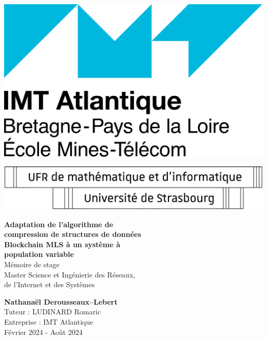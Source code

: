 \begin{titlepage}


    \begin{minipage}{\linewidth}
        \begin{minipage}{0.25\linewidth}
            \centering
            \includegraphics[width=\linewidth]{figs/logo-imt.png}
        \end{minipage}
        \hfill
        \begin{minipage}{0.5\linewidth}
            \centering
            \includegraphics[width=\linewidth]{figs/logo-ufr.png}
        \end{minipage}
    \end{minipage}


    \vfill


    \begin{center}
        {\Huge
            \textbf{
                {Adaptation de l'algorithme de}\\
                {compression de structures de données}\\
                {Blockchain MLS à un système à}\\
                {population variable}\\
            }
        }
        \vspace{0.4cm}
        {\LARGE
            Mémoire de stage\\
        }
        \vspace{0.1cm}
        {
            \Large
            Master Science et Ingénierie des Réseaux,\\ 
            de l'Internet et des Systèmes
        }
    \end{center}


    \vfill


    \begin{center}
        {\Large
            \textbf{Nathanaël Derousseaux--Lebert}
        }\\
        Tuteur : LUDINARD Romaric\\
        Entreprise : IMT Atlantique\\
        Février 2024 - Août 2024\\

    \end{center}

\end{titlepage}
